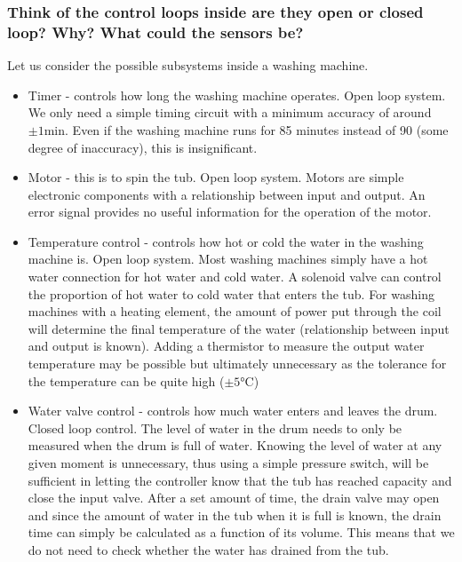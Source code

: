 \documentclass[class=report, crop=false, 12pt,a4paper]{standalone}
\begin{document}
\subsubsection*{Think of the control loops inside are they open or closed loop? Why? What could the sensors be?}
Let us consider the possible subsystems inside a washing machine.
\begin{itemize}
  \item Timer - controls how long the washing machine operates. Open loop system. We only need a simple timing circuit with a minimum accuracy of around $\pm 1 \si{\minute}$. Even if the washing machine runs for 85 minutes instead of 90 (some degree of inaccuracy), this is insignificant. 
  \item Motor - this is to spin the tub. Open loop system. Motors are simple electronic components with a relationship between input and output. An error signal provides no useful information for the operation of the motor. 
  \item Temperature control - controls how hot or cold the water in the washing machine is. Open loop system. Most washing machines simply have a hot water connection for hot water and cold water. A solenoid valve can control the proportion of hot water to cold water that enters the tub. For washing machines with a heating element, the amount of power put through the coil will determine the final temperature of the water (relationship between input and output is known). Adding a thermistor to measure the output water temperature may be possible but ultimately unnecessary as the tolerance for the temperature can be quite high ($\pm 5 \si{\celsius}$)
  \item Water valve control - controls how much water enters and leaves the drum. Closed loop control. The level of water in the drum needs to only be measured when the drum is full of water. Knowing the level of water at any given moment is unnecessary, thus using a simple pressure switch, will be sufficient in letting the controller know that the tub has reached capacity and close the input valve. After a set amount of time, the drain valve may open and since the amount of water in the tub when it is full is known, the drain time can simply be calculated as a function of its volume. This means that we do not need to check whether the water has drained from the tub.
\end{itemize}
\end{document}
